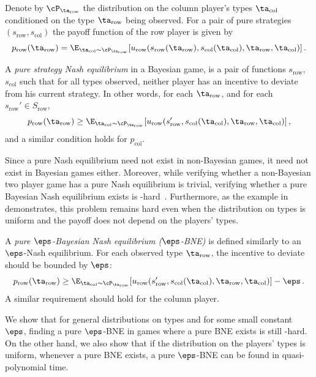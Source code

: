 Denote by $\cP_{\ta_{\mathrm{row}}}$ the distribution on the column player's types $\ta_\mathrm{col}$ conditioned on the type $\ta_{\mathrm{row}}$ being observed. 
For a pair of pure strategies $(s_{\mathrm{row}},s_\mathrm{col})$ the payoff function of the row player  is given by 
$$
p_{\mathrm{row}}(\ta_{\mathrm{row}}) = \E_{\ta_\mathrm{col}\sim \cP_{\ta_{\mathrm{row}}}} [ u_{\mathrm{row}} ( s_{\mathrm{row}}(\ta_{\mathrm{row}}), s_\mathrm{col}(\ta_\mathrm{col}), \ta_{\mathrm{row}}, \ta_\mathrm{col})]\,. 
$$

A \emph{pure strategy Nash equilibrium} in a Bayesian game, is a pair of functions $s_{\mathrm{row}}$, $s_\mathrm{col}$ such that for all types
observed, neither player has an incentive to deviate from his current strategy. In other words, for each $\ta_{\mathrm{row}}$, and 
for each $s_{\mathrm{row}}'\in S_{\mathrm{row}}$, 
$$
p_{\mathrm{row}}(\ta_{\mathrm{row}}) \ge \E_{\ta_\mathrm{col}\sim \cP_{\ta_{\mathrm{row}}}} [u_{\mathrm{row}} ( s_{\mathrm{row}}', s_\mathrm{col}(\ta_\mathrm{col}), \ta_{\mathrm{row}}, \ta_\mathrm{col})]\,,
$$
and a similar condition holds for $p_\mathrm{col}$. 

Since a pure Nash equilibrium need not exist in non-Bayesian games, it
need not exist in Bayesian games either. Moreover, while verifying
whether a non-Bayesian two player game has a pure Nash equilibrium is
trivial, verifying whether a pure Bayesian Nash equilibrium exists is
-hard~\cite{CS08}. Furthermore, as the example in~\cite{CS08}
demonstrates, this problem remains hard even when the distribution on
types is uniform and the payoff does not depend on the players' types.

A \emph{pure  $\eps$-Bayesian Nash equilibrium ($\eps$-BNE)} is defined similarly to an $\eps$-Nash equilibrium. 
For each observed type $\ta_{\mathrm{row}}$, the incentive to deviate should be bounded by $\eps$:
$$
p_{\mathrm{row}}(\ta_{\mathrm{row}}) \ge \E_{\ta_\mathrm{col}\sim \cP_{\ta_{\mathrm{row}}}} [u_{\mathrm{row}} ( s_{\mathrm{row}}', s_\mathrm{col}(\ta_\mathrm{col}), \ta_{\mathrm{row}}, \ta_\mathrm{col})]-\eps\,.
$$
A similar requirement should hold for the column player. 

We show that for general distributions on types and for some small constant $\eps$, finding a pure $\eps$-BNE 
in games where a pure BNE exists is still -hard. On the other hand, we also show that if the distribution on the
players' types is uniform, whenever a pure BNE exists,  a pure $\eps$-BNE can be found in quasi-polynomial time. 


